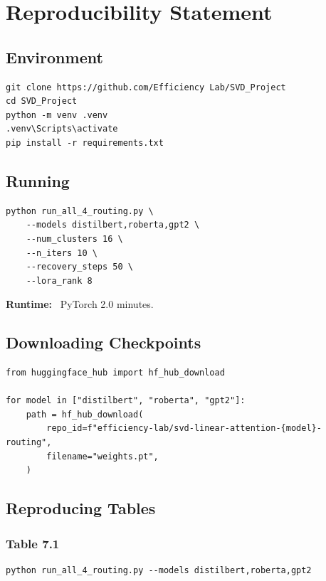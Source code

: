 
\section{Reproducibility Statement}

\subsection{Environment}

\begin{lstlisting}
git clone https://github.com/Efficiency Lab/SVD_Project
cd SVD_Project
python -m venv .venv
.venv\Scripts\activate
pip install -r requirements.txt
\end{lstlisting}

\subsection{Running}

\begin{lstlisting}
python run_all_4_routing.py \
    --models distilbert,roberta,gpt2 \
    --num_clusters 16 \
    --n_iters 10 \
    --recovery_steps 50 \
    --lora_rank 8
\end{lstlisting}

\textbf{Runtime:} ~PyTorch 2.0 minutes.

\subsection{Downloading Checkpoints}

\begin{lstlisting}
from huggingface_hub import hf_hub_download

for model in ["distilbert", "roberta", "gpt2"]:
    path = hf_hub_download(
        repo_id=f"efficiency-lab/svd-linear-attention-{model}-routing",
        filename="weights.pt",
    )
\end{lstlisting}

\subsection{Reproducing Tables}

\subsubsection{Table 7.1}

\begin{lstlisting}
python run_all_4_routing.py --models distilbert,roberta,gpt2
\end{lstlisting}

